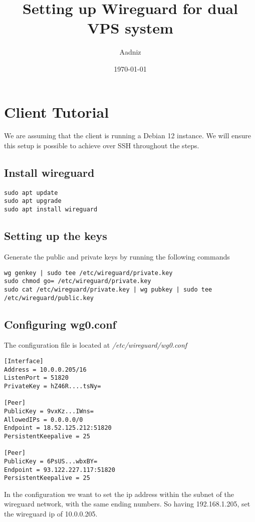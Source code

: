 \documentclass[letterpaper, 11pt]{article}
\author{Aadniz}
\date{\today}
\title{Setting up Wireguard for dual VPS system}
\begin{document}
\maketitle
\tableofcontents

\newpage

\section{Client Tutorial}
\label{sec:org9161e73}
We are assuming that the client is running a Debian 12 instance. We will ensure this setup is possible to achieve over SSH throughout the steps.

\subsection{Install wireguard}
\label{sec:orgd6194fe}
\begin{verbatim}
sudo apt update
sudo apt upgrade
sudo apt install wireguard
\end{verbatim}

\subsection{Setting up the keys}
\label{sec:org182215f}
Generate the public and private keys by running the following commands
\begin{verbatim}
wg genkey | sudo tee /etc/wireguard/private.key
sudo chmod go= /etc/wireguard/private.key
sudo cat /etc/wireguard/private.key | wg pubkey | sudo tee /etc/wireguard/public.key
\end{verbatim}

\subsection{Configuring wg0.conf}
\label{sec:orgf931ed9}

The configuration file is located at \textit{/etc/wireguard/wg0.conf}
\begin{verbatim}
[Interface]
Address = 10.0.0.205/16
ListenPort = 51820
PrivateKey = hZ46R....tsNy=

[Peer]
PublicKey = 9vxKz...IWns=
AllowedIPs = 0.0.0.0/0
Endpoint = 18.52.125.212:51820
PersistentKeepalive = 25

[Peer]
PublicKey = 6PsUS...wbxBY=
Endpoint = 93.122.227.117:51820
PersistentKeepalive = 25
\end{verbatim}

In the configuration we want to set the ip address within the subnet of the wireguard network, with the same ending numbers. So having 192.168.1.205, set the wireguard ip of 10.0.0.205.
\end{document}
